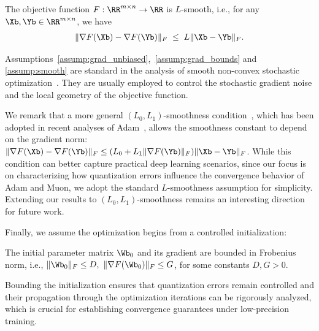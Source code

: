 \documentclass[11pt, letterpaper]{article}
\begin{document}
\begin{assumption}[Smoothness]\label{assump:smooth}
    The objective function $F:\RR^{m\times n}\to\RR$ is $L$-smooth, i.e., for any $\Xb, \Yb \in \RR^{m\times n}$, we have
    \begin{align*}
    \|\nabla F(\Xb) - \nabla F(\Yb)\|_F \;\le\; L \|\Xb - \Yb\|_F.
    \end{align*}
\end{assumption}
Assumptions~\ref{assump:grad_unbiased},~\ref{assump:grad_bounds} and \ref{assump:smooth} are standard in the analysis of smooth non-convex stochastic optimization~\citep{zaheer2018adaptive,chen2018on,zou2019sufficient,defossez2022a,chen2022towards,zhang2022adam,wang2023closing}. They are usually employed to control the stochastic gradient noise and the local geometry of the objective function.

We remark that a more general $(L_0,L_1)$-smoothness condition~\citep{zhang2020why}, which has been adopted in recent analyses of Adam~\citep{li2023convergence,wang2024provable,hong2024convergence}, allows the smoothness constant to depend on the gradient norm: $\|\nabla F(\Xb) - \nabla F(\Yb)\|_F \le (L_0 + L_1 \|\nabla F(\Yb)\|_F) \|\Xb - \Yb\|_F$. While this condition can better capture practical deep learning scenarios, since our focus is on characterizing how quantization errors influence the convergence behavior of Adam and Muon, we adopt the standard $L$-smoothness assumption for simplicity. Extending our results to $(L_0,L_1)$-smoothness remains an interesting direction for future work.

Finally, we assume the optimization begins from a controlled initialization:
\begin{assumption}\label{assump:bound_init}
    The initial parameter matrix $\Wb_0$ and its gradient are bounded in Frobenius norm, i.e., $\|\Wb_0\|_F \le D,\ \|\nabla F(\Wb_0)\|_F \le G$, for some constants $D,G > 0$.
\end{assumption}
Bounding the initialization ensures that quantization errors remain controlled and their propagation through the optimization iterations can be rigorously analyzed, which is crucial for establishing convergence guarantees under low-precision training.
\end{document}
